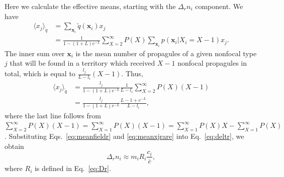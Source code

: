 \documentclass[12pt]{article}
\begin{document}
Here we calculate the effective means, starting with the $\Delta_r n_i$ component. We have
\begin{align}
\langle x_j \rangle_{\tilde{q}}&=\sum_{\mathbf x_i} \tilde{q}({\mathbf x_i})x_j\nonumber\\
&=\frac{1}{1-(1+L)e^{-L}}\sum_{X=2}^{\infty} P(X) \sum_{\mathbf x_i} p({\mathbf x_i}|X_i=X-1)x_j.
\label{eq:raremonster1}
\end{align}
The inner sum over ${\mathbf x_i}$ is the mean number of propagules of a given nonfocal type $j$ that will be found in a territory which received $X-1$ nonfocal propagules in total, which is equal to $\frac{l_j}{L-l_i}(X-1)$. Thus, 
\begin{align}
\langle x_j \rangle_{\tilde{q}}&=\frac{l_j}{1-(1+L)e^{-L}}\frac{1}{L-l_i}\sum_{X=2}^{\infty} P(X) (X-1)\nonumber\\
&=\frac{l_j}{1-(1+L)e^{-L}}\frac{L-1+e^{-L}}{L-l_i},
\label{eq:meanxjrare}
\end{align}
where the last line follows from $\sum_{X=2}^{\infty} P(X)(X-1)=\sum_{X=1}^{\infty} P(X)(X-1)=\sum_{X=1}^{\infty} P(X)X-\sum_{X=1}^{\infty}P(X)$. Substituting Eqs.~\eqref{eq:meanfieldr} and \eqref{eq:meanxjrare} into Eq.~\eqref{eq:deltr}, we obtain
\begin{equation}
\Delta_r n_i\approx m_i R_i\frac{c_i}{\overline{c}}, \label{eq:deltrfinal}
\end{equation}
where $R_i$ is defined in Eq.~\eqref{eq:Dr}.
\end{document}
